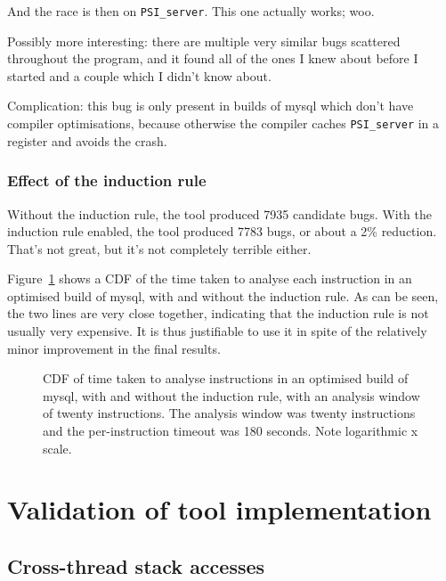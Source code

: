 And the race is then on \verb|PSI_server|.  This one actually works;
woo.

Possibly more interesting: there are multiple very similar bugs
scattered throughout the program, and it found all of the ones I knew
about before I started and a couple which I didn't know about.

Complication: this bug is only present in builds of mysql which don't
have compiler optimisations, because otherwise the compiler caches
\verb|PSI_server| in a register and avoids the crash.


\subsubsection{Effect of the induction rule}

Without the induction rule, the tool produced 7935 candidate bugs.
With the induction rule enabled, the tool produced 7783 bugs, or about
a 2\% reduction.  That's not great, but it's not completely terrible
either.

Figure~\ref{fig:eval:mysql:analysis_cdf} shows a CDF of the time taken
to analyse each instruction in an optimised build of mysql, with and
without the induction rule.  As can be seen, the two lines are very
close together, indicating that the induction rule is not usually very
expensive.  It is thus justifiable to use it in spite of the
relatively minor improvement in the final results.

\begin{figure}

\caption{CDF of time taken to analyse instructions in an optimised
  build of mysql, with and without the induction rule, with an
  analysis window of twenty instructions.  The analysis window was
  twenty instructions and the per-instruction timeout was 180 seconds.
  Note logarithmic x scale.} 
\label{fig:eval:mysql:analysis_cdf}
\end{figure}
  
\section{Validation of tool implementation}

\subsection{Cross-thread stack accesses}


